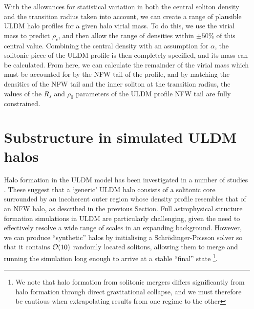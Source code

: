 \documentclass[a4paper,11pt]{article}
\begin{document}
With the allowances for statistical variation in both the central soliton density and the transition radius taken into account, we can create a range of plausible ULDM halo profiles for a given halo virial mass. To do this, we use the virial mass to predict $\rho_c$, and then allow the range of densities within $\pm 50\% $ of this central value. Combining the central density with an assumption for $\alpha$, the solitonic piece of the ULDM profile is then completely specified, and its mass can be calculated. From here, we can calculate the remainder of the virial mass which must be accounted for by the NFW tail of the profile, and by matching the densities of the NFW tail and the inner soliton at the transition radius, the values of the $R_s$ and $\rho_0$ parameters of the ULDM profile NFW tail are fully constrained.  



\section{Substructure in simulated ULDM halos}\label{sec:sim_comparison}

Halo formation in the ULDM model has been investigated in a number of studies \cite{Schwabe:2016rze, Mocz:2017wlg, Lin:2018whl}. These suggest that a `generic' ULDM halo consists of a solitonic core surrounded by an incoherent outer region whose density profile resembles that of an NFW halo, as described in the previous Section. Full astrophysical structure formation simulations in ULDM are particularly challenging, given the need to effectively resolve a wide range of scales in an expanding background. However, we can produce ``synthetic'' halos by initialising a Schr{\"o}dinger-Poisson solver so that it contains ${\cal{O}}(10)$ randomly located solitons, allowing them to merge and running the simulation long enough to arrive at a stable ``final'' state \footnote{We note that halo formation from solitonic mergers differs significantly from halo formation through direct gravitational collapse, and we must therefore be cautious when extrapolating results from one regime to the other}. 
\end{document}
